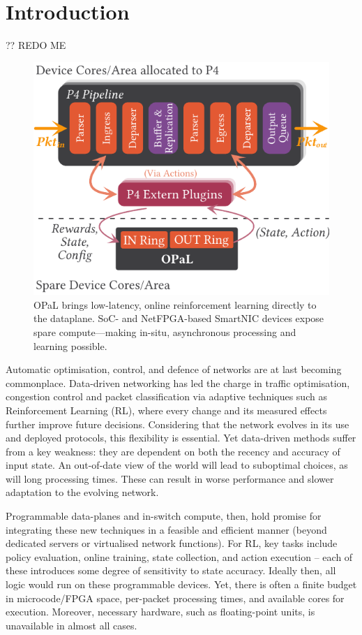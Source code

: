 \documentclass[sigconf,natbib=false]{acmart}
\newcommand{\approachshort}{OPaL}
\begin{document}
\setlength{\aweboxleftmargin}{0.12\linewidth}
\setlength{\aweboxcontentwidth}{1.97\linewidth}
	
\section{Introduction}
?? REDO ME

\begin{figure}
	\centering
	\includegraphics[keepaspectratio, width=0.9\linewidth]{figures/arch-with-p4}
	\caption{\approachshort{} brings low-latency, online reinforcement learning directly to the dataplane. SoC- and NetFPGA-based SmartNIC devices expose spare compute---making in-situ, asynchronous processing and learning possible.\label{fig:netro-arch}}
\end{figure}

Automatic optimisation, control, and defence of networks are at last becoming commonplace. Data-driven networking has led the charge in traffic optimisation, congestion control and packet classification via adaptive techniques such as Reinforcement Learning (RL), where every change and its measured effects further improve future decisions. Considering that the network evolves in its use and deployed protocols, this flexibility is essential. Yet data-driven methods suffer from a key weakness: they are dependent on both the recency and accuracy of input state. An out-of-date view of the world will lead to suboptimal choices, as will long processing times. These can result in worse performance and slower adaptation to the evolving network.

Programmable data-planes and in-switch compute, then, hold promise for integrating these new techniques in a feasible and efficient manner (beyond dedicated servers or virtualised network functions). For RL, key tasks include policy evaluation, online training, state collection, and action execution -- each of these introduces some degree of sensitivity to state accuracy. Ideally then, all logic would run on these programmable devices. Yet, there is often a finite budget in microcode/FPGA space, per-packet processing times, and available cores for execution. Moreover, necessary hardware, such as floating-point units, is unavailable in almost all cases.
\end{document}
